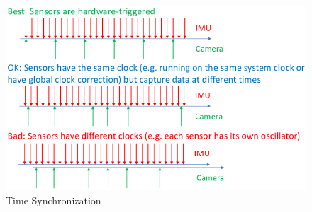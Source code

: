 \documentclass[12pt,a4paper]{article}
\begin{document}
\begin{figure}[htbp]
\centering
\includegraphics[scale=0.4]{images/time_synchronization.png}
\caption{Time Synchronization}
\label{fig:time_synchronization}
\end{figure}
\end{document}
